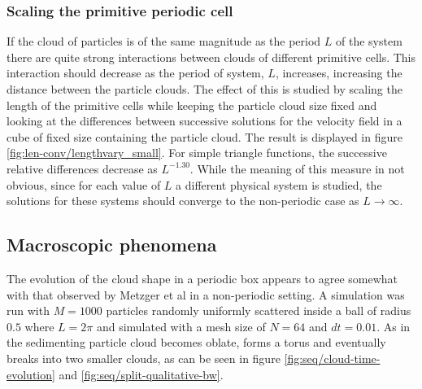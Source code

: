 \documentclass[a4paper,
twoside=false,abstract=false,numbers=noenddot,
titlepage=false,headings=small,parskip=half,version=last]{scrartcl}
\begin{document}
\subsubsection{Scaling the primitive periodic cell}\label{cellscale}
If the cloud of particles is of the same magnitude as the period $L$ of the system there are quite strong interactions between clouds of different primitive cells.
This interaction should decrease as the period of system, $L$, increases, increasing the distance between the particle clouds.
The effect of this is studied by scaling the length of the primitive cells while keeping the particle cloud size fixed and looking at the differences between successive solutions for the velocity field in a cube of fixed size containing the particle cloud.
The result is displayed in figure \ref{fig:len-conv/lengthvary_small}.
For simple triangle functions, the successive relative differences decrease as $L^{-1.30}$.
While the meaning of this measure in not obvious, since for each value of $L$ a different physical system is studied, the solutions for these systems should converge to the non-periodic case as $L\rightarrow \infty$.

\subsection{Macroscopic phenomena}
The evolution of the cloud shape in a periodic box appears to agree somewhat with that observed by Metzger et al \cite{fallingclouds} in a non-periodic setting.
A simulation was run with $M=1000$ particles randomly uniformly scattered inside a ball of radius $0.5$ where $L=2\pi$ and simulated with a mesh size of $N=64$ and $dt=0.01$.
As in \cite{fallingclouds} the sedimenting particle cloud becomes oblate, forms a torus and eventually breaks into two smaller clouds, as can be seen in figure \ref{fig:seq/cloud-time-evolution} and \ref{fig:seq/split-qualitative-bw}.

\end{document}
